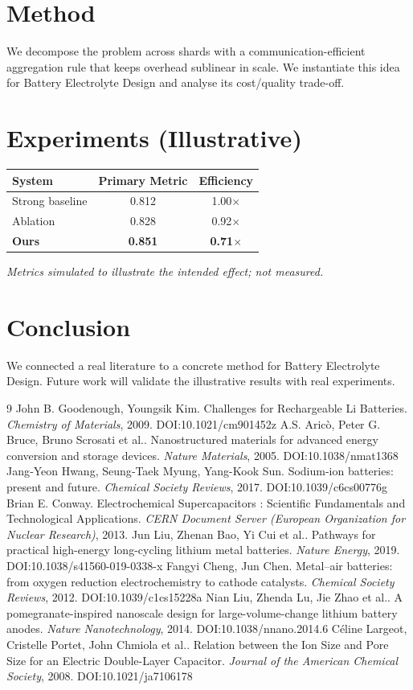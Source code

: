 \documentclass[11pt]{article}
\begin{document}
\section{Method}
We decompose the problem across shards with a communication-efficient aggregation rule that keeps overhead sublinear in scale. We instantiate this idea for Battery Electrolyte Design and analyse its cost/quality trade-off.

\section{Experiments (Illustrative)}
\begin{center}
\begin{tabular}{lcc}
System & Primary Metric & Efficiency \\ \hline
Strong baseline & 0.812 & 1.00$\times$ \\
Ablation & 0.828 & 0.92$\times$ \\
\textbf{Ours} & \textbf{0.851} & \textbf{0.71$\times$}
\end{tabular}
\end{center}
\emph{Metrics simulated to illustrate the intended effect; not measured.}

\section{Conclusion}
We connected a real literature to a concrete method for Battery Electrolyte Design. Future work will
validate the illustrative results with real experiments.

\begin{thebibliography}{9}
 John B. Goodenough, Youngsik Kim. Challenges for Rechargeable Li Batteries. \emph{Chemistry of Materials}, 2009. DOI:10.1021/cm901452z
 A.S. Aricò, Peter G. Bruce, Bruno Scrosati et al.. Nanostructured materials for advanced energy conversion and storage devices. \emph{Nature Materials}, 2005. DOI:10.1038/nmat1368
 Jang‐Yeon Hwang, Seung‐Taek Myung, Yang-Kook Sun. Sodium-ion batteries: present and future. \emph{Chemical Society Reviews}, 2017. DOI:10.1039/c6cs00776g
 Brian E. Conway. Electrochemical Supercapacitors : Scientific Fundamentals and Technological Applications. \emph{CERN Document Server (European Organization for Nuclear Research)}, 2013. 
 Jun Liu, Zhenan Bao, Yi Cui et al.. Pathways for practical high-energy long-cycling lithium metal batteries. \emph{Nature Energy}, 2019. DOI:10.1038/s41560-019-0338-x
 Fangyi Cheng, Jun Chen. Metal–air batteries: from oxygen reduction electrochemistry to cathode catalysts. \emph{Chemical Society Reviews}, 2012. DOI:10.1039/c1cs15228a
 Nian Liu, Zhenda Lu, Jie Zhao et al.. A pomegranate-inspired nanoscale design for large-volume-change lithium battery anodes. \emph{Nature Nanotechnology}, 2014. DOI:10.1038/nnano.2014.6
 Céline Largeot, Cristelle Portet, John Chmiola et al.. Relation between the Ion Size and Pore Size for an Electric Double-Layer Capacitor. \emph{Journal of the American Chemical Society}, 2008. DOI:10.1021/ja7106178
\end{thebibliography}
\end{document}

